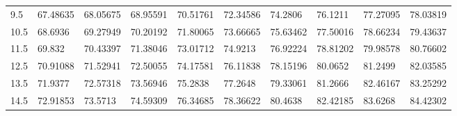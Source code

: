 \documentclass[10pt,twocolumn,letterpaper]{article}
\begin{document}
\begin{table}
{\begin{tabular}{llllllllll}
    9.5             & 67.48635                               & 68.05675                               & 68.95591                                & 70.51761                                & 72.34586                                & 74.2806                                 & 76.1211                                 & 77.27095                                & 78.03819                                \\
    10.5            & 68.6936                                & 69.27949                               & 70.20192                                & 71.80065                                & 73.66665                                & 75.63462                                & 77.50016                                & 78.66234                                & 79.43637                                \\
    11.5            & 69.832                                 & 70.43397                               & 71.38046                                & 73.01712                                & 74.9213                                 & 76.92224                                & 78.81202                                & 79.98578                                & 80.76602                                \\
    12.5            & 70.91088                               & 71.52941                               & 72.50055                                & 74.17581                                & 76.11838                                & 78.15196                                & 80.0652                                 & 81.2499                                 & 82.03585                                \\
    13.5            & 71.9377                                & 72.57318                               & 73.56946                                & 75.2838                                 & 77.2648                                 & 79.33061                                & 81.2666                                 & 82.46167                                & 83.25292                                \\
    14.5            & 72.91853                               & 73.5713                                & 74.59309                                & 76.34685                                & 78.36622                                & 80.4638                                 & 82.42185                                & 83.6268                                 & 84.42302                                \\

\end{tabular}}
\end{table}
\end{document}
